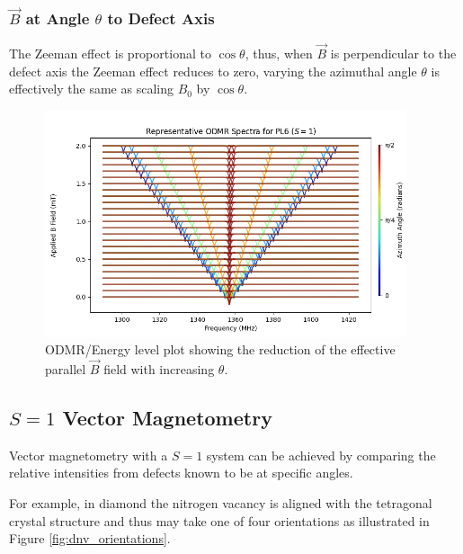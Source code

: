 \subsubsection{$\vec{B}$ at Angle $\theta$ to Defect Axis}
The Zeeman effect is proportional to $\cos\theta$, thus, when $\vec{B}$ is perpendicular to the defect axis the Zeeman effect reduces to zero, varying the azimuthal angle $\theta$ is effectively the same as scaling $B_0$ by $\cos \theta$. 

\begin{figure}[h]
    \begin{center}
    \includegraphics[width=0.95\textwidth]{figures/PL6ODMRSpectra_theta_0_to_90.png}
    \end{center}
    \caption{ODMR/Energy level plot showing the reduction of the effective parallel $\vec{B}$ field with increasing $\theta$.} 
    \label{fig:}
\end{figure}


\subsection{$S=1$ Vector Magnetometry}
Vector magnetometry with a $S=1$ system can be achieved by comparing the relative intensities from defects known to be at specific angles. 

For example, in diamond the nitrogen vacancy is aligned with the tetragonal crystal structure and thus may take one of four orientations as illustrated in Figure \ref{fig:dnv_orientations}. 

